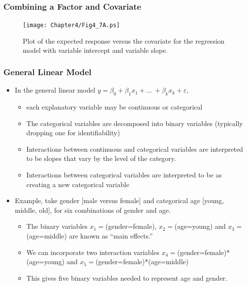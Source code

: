 \begin{frame}%
\frametitle{Combining a Factor and Covariate}
\begin{figure}[htp]
  \begin{center}
    \texttt{[image: Chapter4/Fig4\_7A.ps]}
    \caption{\label{F4:TheoryVarIntVarSlope} \small  Plot of the expected response versus the covariate for the regression model
with variable intercept and variable slope.}
  \end{center}
\end{figure}
\end{frame}


\begin{frame}[shrink=10]
\frametitle{General Linear Model}
\begin{itemize}
\item In the general linear model
$ y=\beta _{0}+\beta _{1}x_{1}+\ldots \ +\beta _{k}x_{k} +
\varepsilon,$
\begin{itemize}
\item each explanatory variable may be continuous or
categorical
\item The categorical variables are decomposed into binary variables
(typically dropping one for identifiability)
\item Interactions between continuous and categorical variables are
interpreted to be slopes that vary by the level of the category.
\item Interactions between categorical variables are interpreted to
be as creating a new categorical variable
\end{itemize}
\item Example, take gender [male versus female] and
categorical age [young, middle, old], for six combinations of gender
and age.
\begin{itemize}
\item The binary variables $x_1=$(gender=female), $x_2=$(age=young) and
$x_3=$(age=middle) are known as ``main effects.''
\item We can incorporate two interaction variables
$x_4=$(gender=female)*(age=young) and
$x_5=$(gender=female)*(age=middle)
\item This gives five binary variables needed to represent age and gender.


\end{itemize}
\end{itemize}
\end{frame}

